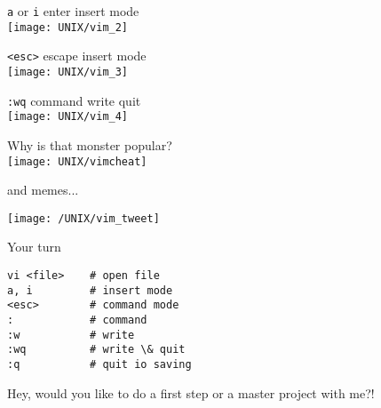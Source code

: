 \documentclass[xcolor=dvipsnames]{beamer}
\begin{document}
\begin{frame}[fragile]
	\begin{center}
		\Large
		\verb!a! or \verb!i! enter insert mode \\
		\vspace{1cm}
		\texttt{[image: UNIX/vim\_2]}
	\end{center}
\end{frame}

\begin{frame}[fragile]
	\begin{center}
		\Large
		\verb!<esc>! escape insert mode\\
		\vspace{1cm}
		\texttt{[image: UNIX/vim\_3]}
	\end{center}
\end{frame}

\begin{frame}[fragile]
	\begin{center}
		\Large
		\verb!:wq! command write quit\\
		\vspace{1cm}
		\texttt{[image: UNIX/vim\_4]}
	\end{center}
\end{frame}

\begin{frame}
	\begin{center}
		\Huge
		Why is that monster popular?\\
		\vspace{1cm}
		\texttt{[image: UNIX/vimcheat]}
	\end{center}
	\hfill and memes...
\end{frame}

\begin{frame}
	\begin{center}
		\texttt{[image: /UNIX/vim\_tweet]}
	\end{center}
\end{frame}

\begin{frame}[fragile]
\begin{center}
	\Huge
	Your turn
\end{center}
\Large
\begin{verbatim}
vi <file>    # open file
a, i         # insert mode
<esc>        # command mode
:            # command
:w           # write
:wq          # write \& quit
:q           # quit io saving
\end{verbatim}
\end{frame}

\begin{frame}
	\begin{center}
		\Huge
		Hey, would you like to do a first step or a master project with me?!\\
	\end{center}
\end{frame}
\end{document}
